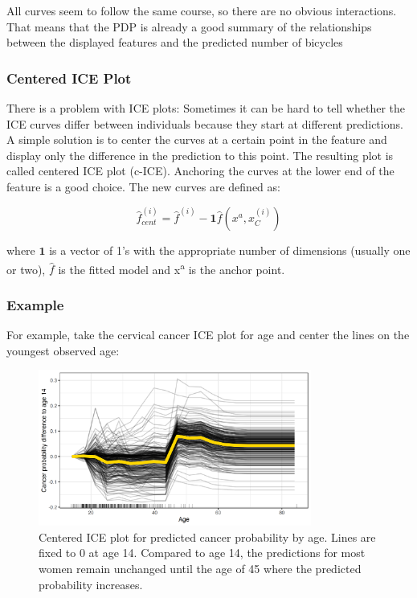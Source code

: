 \documentclass[
  11pt,
]{scrbook}
\begin{document}
All curves seem to follow the same course, so there are no obvious interactions.
That means that the PDP is already a good summary of the relationships between the displayed features and the predicted number of bicycles

\hypertarget{centered-ice-plot}{%
\subsubsection{Centered ICE Plot}\label{centered-ice-plot}}

There is a problem with ICE plots:
Sometimes it can be hard to tell whether the ICE curves differ between individuals because they start at different predictions.
A simple solution is to center the curves at a certain point in the feature and display only the difference in the prediction to this point.
The resulting plot is called centered ICE plot (c-ICE).
Anchoring the curves at the lower end of the feature is a good choice.
The new curves are defined as:

\[\hat{f}_{cent}^{(i)}=\hat{f}^{(i)}-\mathbf{1}\hat{f}(x^{a},x^{(i)}_{C})\]

where \(\mathbf{1}\) is a vector of 1's with the appropriate number of dimensions (usually one or two), \(\hat{f}\) is the fitted model and x\textsuperscript{a} is the anchor point.

\hypertarget{example-4}{%
\subsubsection{Example}\label{example-4}}

For example, take the cervical cancer ICE plot for age and center the lines on the youngest observed age:

\begin{figure}

{\centering \includegraphics[width=0.8\textwidth]{images/ice-cervical-centered-1} 

}

\caption{Centered ICE plot for predicted  cancer probability by age. Lines are fixed to 0 at age 14. Compared to age 14, the predictions for most women remain unchanged until the age of 45 where the predicted probability increases.}\label{fig:ice-cervical-centered}
\end{figure}
\end{document}
